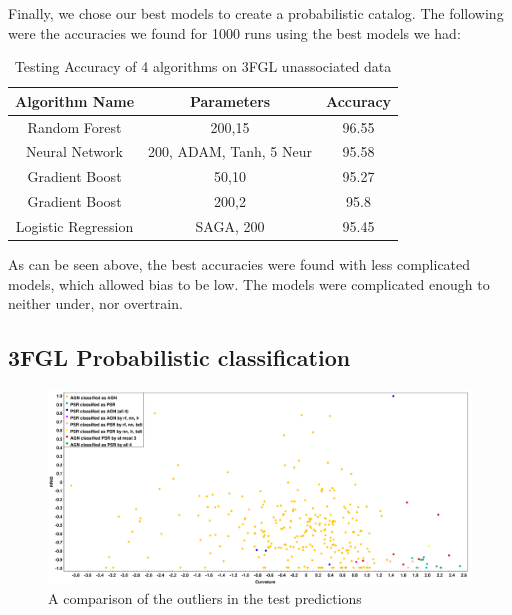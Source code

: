  

Finally, we chose our best models to create a probabilistic catalog. The following were the accuracies we found for 1000 runs using the best models we had:\\



\begin{table}[!h]
    \tiny
    \centering
    \renewcommand{\tabcolsep}{1mm}
\renewcommand{\arraystretch}{1.5}

    \begin{tabular}{|c|c|c|}
    \hline
    Algorithm Name&Parameters & Accuracy\\
    \hline
    Random Forest& 200,15  & 96.55   \\
    \hline
    Neural Network & 200, ADAM, Tanh, 5 Neur     &  95.58 \\
    \hline %
    Gradient Boost& 50,10    &   95.27  \\
    \hline %
    Gradient Boost&200,2    &   95.8  \\
    \hline
    Logistic Regression& SAGA, 200 &95.45 \\
    \hline
     
    \end{tabular}

    \caption{Testing Accuracy of 4 algorithms on 3FGL unassociated data}
    \label{tab:my_labe2l}
\end{table}


As can be seen above, the best accuracies were found with less complicated models, which allowed bias to be low. The models were complicated enough to neither under, nor overtrain. \\

\subsection{3FGL Probabilistic classification} 

\begin{figure}[h]
\includegraphics[width=\twopicsp\textwidth]{plots/final_catalog.pdf}
\caption{A comparison of the outliers in the test predictions}
\label{fig:Maps_data}
\end{figure}
